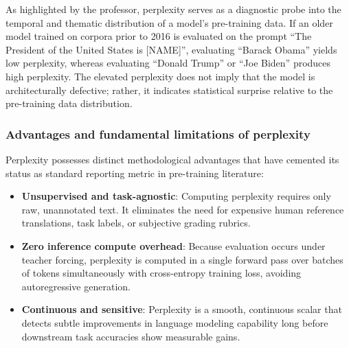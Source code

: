 \documentclass[../../../main.tex]{subfiles}
\begin{document}
As highlighted by the professor, perplexity serves as a diagnostic probe into the temporal and thematic distribution of a model's pre-training data. If an older model trained on corpora prior to 2016 is evaluated on the prompt ``The President of the United States is [NAME]'', evaluating ``Barack Obama'' yields low perplexity, whereas evaluating ``Donald Trump'' or ``Joe Biden'' produces high perplexity. The elevated perplexity does not imply that the model is architecturally defective; rather, it indicates statistical surprise relative to the pre-training data distribution.

\subsubsection{Advantages and fundamental limitations of perplexity}
Perplexity possesses distinct methodological advantages that have cemented its status as standard reporting metric in pre-training literature:
\begin{itemize}
    \item \textbf{Unsupervised and task-agnostic}: Computing perplexity requires only raw, unannotated text. It eliminates the need for expensive human reference translations, task labels, or subjective grading rubrics.
    \item \textbf{Zero inference compute overhead}: Because evaluation occurs under teacher forcing, perplexity is computed in a single forward pass over batches of tokens simultaneously with cross-entropy training loss, avoiding autoregressive generation.
    \item \textbf{Continuous and sensitive}: Perplexity is a smooth, continuous scalar that detects subtle improvements in language modeling capability long before downstream task accuracies show measurable gains.
\end{itemize}
\end{document}
